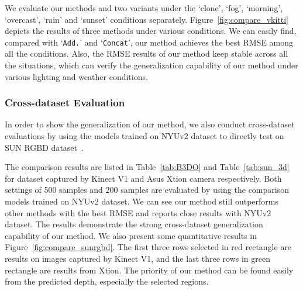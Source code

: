 \documentclass[journal]{IEEEtran}
\begin{document}
We evaluate our methods and two variants under the `clone', `fog', `morning', `overcast', `rain' and `sunset' conditions separately.
Figure~\ref{fig:compare_vkitti} depicts the results of three methods under various conditions.
We can easily find, compared with `\texttt{Add.}' and `\texttt{Concat}', our method achieves the best RMSE among all the conditions.
Also, the RMSE results of our method keep stable across all the situations,
which can verify the generalization capability of our method under various lighting and weather conditions.



\subsubsection{Cross-dataset Evaluation}
In order to show the generalization of our method,
we also conduct cross-dataset evaluations by using the models trained on NYUv2 dataset to directly test on SUN RGBD dataset~\cite{sun_rgbd}.



The comparison results are listed in Table~\ref{tab:B3DO} and Table~\ref{tab:sun_3d} for dataset captured by Kinect V1 and Asus Xtion camera respectively.
Both settings of 500 samples and 200 samples are evaluated by using the comparison models trained on NYUv2 dataset.
We can see our method still outperforms other methods with the best RMSE and reports close results with NYUv2 dataset.
The results demonstrate the strong cross-dataset generalization capability of our method.
We also present some quantitative results in Figure~\ref{fig:compare_sunrgbd}.
The first three rows selected in red rectangle are results on images captured by Kinect V1,
and the last three rows in green rectangle are results from Xtion.
The priority of our method can be found easily from the predicted depth, especially the selected regions.
\end{document}

